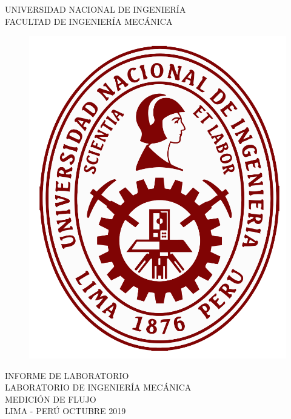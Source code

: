 \documentclass[a4paper,12pt]{report}
\begin{document}
\setcounter{page}{1}
\thispagestyle{empty}
\begin{center}
{\huge UNIVERSIDAD NACIONAL DE INGENIERÍA}\\[0.9cm]
{\Large FACULTAD DE INGENIERÍA MECÁNICA}\\[0.6in]
\end{center}
\begin{figure}[h]
\begin{center}
\includegraphics[scale=0.33]{logoUNI.png}
\vspace{0cm}
\end{center}
\end{figure}
\vspace{0.5cm}
\begin{center}
INFORME DE LABORATORIO\\
LABORATORIO DE INGENIERÍA MECÁNICA\\[14mm]
{\large MEDICIÓN DE FLUJO}\\[10mm]
\vfill
LIMA - PERÚ \hfill OCTUBRE 2019
\end{center}
\end{document}
